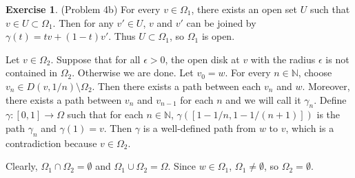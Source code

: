 \documentclass[12pt, psamsfonts]{amsart}
\theoremstyle{definition}
\newtheorem*{exer}{Exercise}
\theoremstyle{remark}
\numberwithin{equation}{section}
\begin{document}
\begin{exer}{(Problem 4b)}
  For every $v \in \Omega_1$, there exists an open set $U$ such that $v \in U \subset \Omega_1$.
  Then for any $v' \in U$, $v$ and $v'$ can be joined by $\gamma(t) = tv + (1 - t)v'$.
  Thus $U \subset \Omega_1$, so $\Omega_1$ is open.

  Let $v \in \Omega_2$.
  Suppose that for all $\epsilon > 0$, the open disk at $v$ with the radius $\epsilon$ is not contained in $\Omega_2$.
  Otherwise we are done.
  Let $v_0 = w$.
  For every $n \in \mathbb{N}$, choose $v_n \in D(v, 1/n) \setminus \Omega_2$.
  Then there exists a path between each $v_n$ and $w$.
  Moreover, there exists a path between $v_n$ and $v_{n - 1}$ for each $n$ and we will call it $\gamma_n$.
  Define $\gamma: [0, 1] \rightarrow \Omega$ such that for each $n \in \mathbb{N}$, $\gamma([1 - 1/n, 1 - 1/(n+1)])$ is the path $\gamma_n$ and $\gamma(1) = v$.
  Then $\gamma$ is a well-defined path from $w$ to $v$, which is a contradiction because $v \in \Omega_2$.

  Clearly, $\Omega_1 \cap \Omega_2 = \emptyset$ and $\Omega_1 \cup \Omega_2 = \Omega$.
  Since $w \in \Omega_1$, $\Omega_1 \ne \emptyset$, so $\Omega_2 = \emptyset$.
\end{exer}
\end{document}
